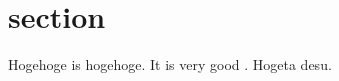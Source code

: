 
\section{section}

Hogehoge is hogehoge\cite{hoge1}. It is very good \cite{hoge2}. Hogeta desu\cite{hoge3}.